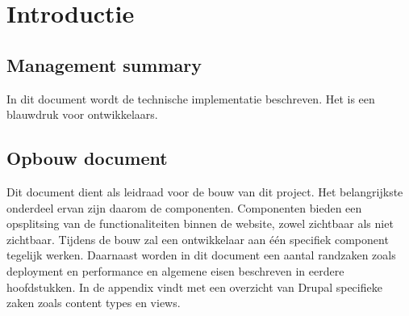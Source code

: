 
\section{Introductie}

\subsection{Management summary}
In dit document wordt de technische implementatie beschreven. Het is een blauwdruk voor ontwikkelaars. 

\subsection{Opbouw document}
Dit document dient als leidraad voor de bouw van dit project. Het belangrijkste onderdeel ervan zijn daarom de componenten. Componenten bieden een opsplitsing van de functionaliteiten binnen de website, zowel zichtbaar als niet zichtbaar. Tijdens de bouw zal een ontwikkelaar aan \'{e}\'{e}n specifiek component tegelijk werken. Daarnaast worden in dit document een aantal randzaken zoals deployment en performance en algemene eisen beschreven in eerdere hoofdstukken. In de appendix vindt met een overzicht van Drupal specifieke zaken zoals content types en views.